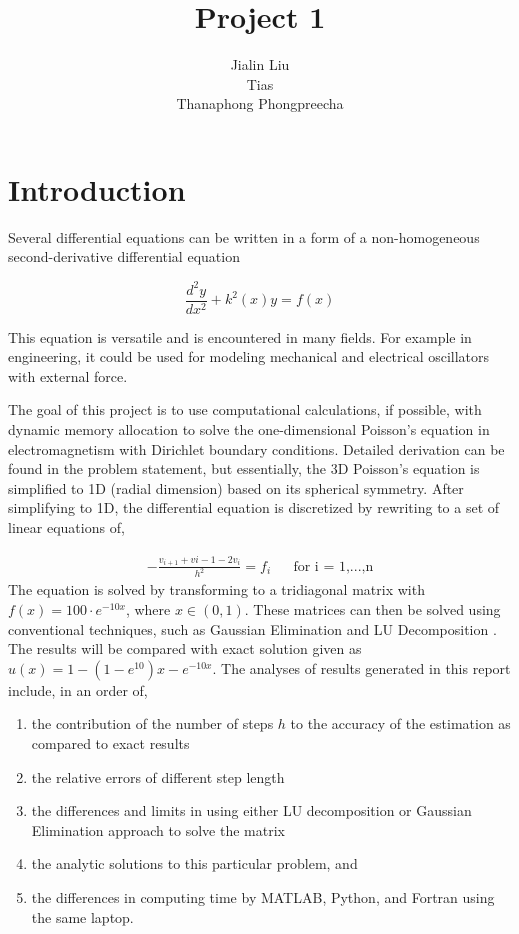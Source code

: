 \documentclass{article}
\begin{document}
	
	\title{Project 1}
	\author{Jialin Liu \\ Tias \\ Thanaphong Phongpreecha}
	\maketitle
	
	\newpage
	
	\section{Introduction}
		Several differential equations can be written in a form of a non-homogeneous second-derivative differential equation 
		
		\begin{equation*}	
		\frac{d^{2}y}{dx^2} + k^2(x)y=f(x)
		\end{equation*}
		
		This equation is versatile and is encountered in many fields. For example in engineering, it could be used for modeling mechanical and electrical oscillators with external force. \cite{example}
		
		The goal of this project is to use computational calculations, if possible, with dynamic memory allocation to solve the one-dimensional Poisson's equation in electromagnetism with Dirichlet boundary conditions. Detailed derivation can be found in the problem statement, but essentially, the 3D Poisson's equation is simplified to 1D (radial dimension) based on its spherical symmetry. After simplifying to 1D, the differential equation is discretized by rewriting to a set of linear equations of,
		
		\begin{align*}
		-\frac{v_{i+1}+v{i-1}-2v_i}{h^2}=f_i && \text{for i = 1,...,n}
		\end{align*}
		The equation is solved by transforming to a tridiagonal matrix with $f(x)=100 \cdot e^{-10x}$, where $x \in (0,1) $. These matrices can then be solved using conventional techniques, such as Gaussian Elimination and LU Decomposition \cite{rice2012applied}. The results will be compared with exact solution given as $u(x)=1-(1-e^{10})x-e^{-10x}$. The analyses of results generated in this report include, in an order of,
		
		\begin{enumerate}
		\item the contribution of the number of steps $h$ to the accuracy of the estimation as compared to exact results 
		\item the relative errors of different step length 
		\item the differences and limits in using either LU decomposition or Gaussian Elimination approach to solve the matrix
		\item the analytic solutions to this particular problem, and 
		\item the differences in computing time by MATLAB, Python, and Fortran using the same laptop.
		
		\end{enumerate}
		
		
		
	    
	    
		
		
\end{document}
